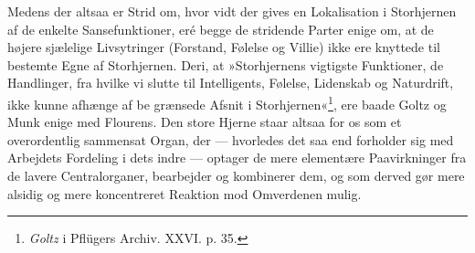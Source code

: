 \documentclass[12pt,a4paper,openany]{book}
\newcommand{\opage}[1]{\marginnote{\footnotesize\textit{[#1]}}}
\begin{document}
Medens der altsaa er Strid om, hvor vidt der gives en Lokalisation i
Storhjernen af de enkelte Sansefunktioner, eré begge de stridende Parter
enige om, at de højere sjælelige Livsytringer (Forstand, Følelse og
Villie) ikke ere knyttede til bestemte Egne af Storhjernen. Deri, at
»Storhjernens vigtigste Funktioner, de Handlinger, fra hvilke vi slutte
til Intelligents, Følelse, Lidenskab og Naturdrift, ikke kunne afhænge
af be%
\opage{51}grænsede Afsnit i Storhjernen«\footnote[1]{\emph{Goltz} i
Pflügers Archiv. XXVI. p. 35.}, ere baade Goltz og Munk enige med
Flourens. Den store Hjerne staar altsaa for os som et overordentlig
sammensat Organ, der --- hvorledes det saa end forholder sig med
Arbejdets Fordeling i dets indre --- optager de mere elementære
Paavirkninger fra de lavere Centralorganer, bearbejder og kombinerer
dem, og som derved gør mere alsidig og mere koncentreret Reaktion mod
Omverdenen mulig.
\end{document}
